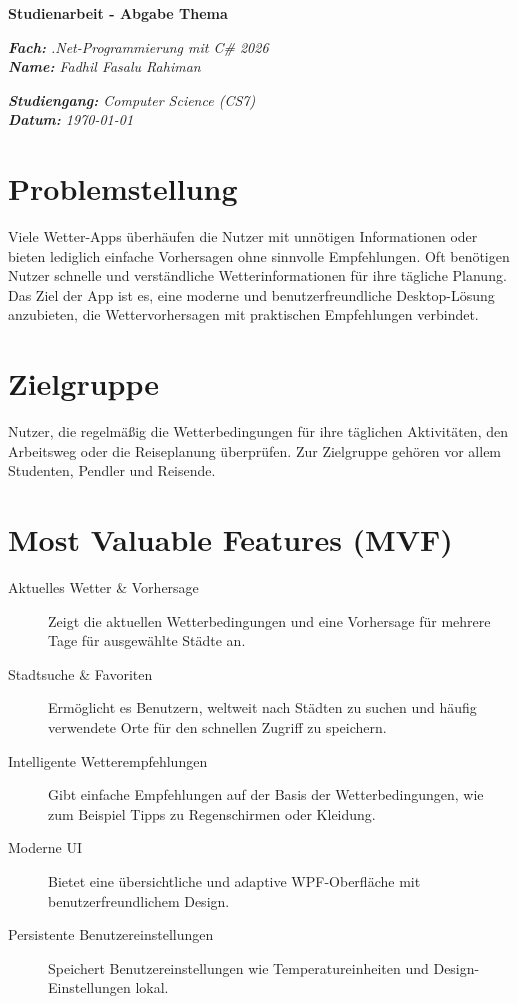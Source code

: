 \documentclass[12pt,a4paper]{article}
\begin{document}
\noindent
{\fontsize{24}{28}\selectfont\bfseries Studienarbeit - Abgabe Thema} \\
\begin{minipage}[t]{0.5\textwidth}
  \vspace{8pt}
  {\itshape \textbf{Fach:} .Net-Programmierung mit C\# 2026} \\
  {\itshape \textbf{Name:} Fadhil Fasalu Rahiman}
\end{minipage}
\begin{minipage}[t]{0.5\textwidth}
  \flushright
  \vspace{8pt}
  \itshape \textbf{Studiengang:} Computer Science (CS7)\\
  \itshape \textbf{Datum:} \today
\end{minipage}

\section{Problemstellung}
Viele Wetter-Apps überhäufen die Nutzer mit unnötigen Informationen oder bieten lediglich einfache Vorhersagen ohne sinnvolle Empfehlungen. Oft benötigen Nutzer schnelle und verständliche Wetterinformationen für ihre tägliche Planung. Das Ziel der App ist es, eine moderne und benutzerfreundliche Desktop-Lösung anzubieten, die Wettervorhersagen mit praktischen Empfehlungen verbindet.

\section{Zielgruppe}
Nutzer, die regelmäßig die Wetterbedingungen für ihre täglichen Aktivitäten, den Arbeitsweg oder die Reiseplanung überprüfen. Zur Zielgruppe gehören vor allem Studenten, Pendler und Reisende.

\section{Most Valuable Features (MVF)}
\begin{description}
  \item [Aktuelles Wetter \& Vorhersage] Zeigt die aktuellen Wetterbedingungen und eine Vorhersage für mehrere Tage für ausgewählte Städte an.
  \item [Stadtsuche \& Favoriten] Ermöglicht es Benutzern, weltweit nach Städten zu suchen und häufig verwendete Orte für den schnellen Zugriff zu speichern.
  \item [Intelligente Wetterempfehlungen] Gibt einfache Empfehlungen auf der Basis der Wetterbedingungen, wie zum Beispiel Tipps zu Regenschirmen oder Kleidung.
  \item [Moderne UI] Bietet eine übersichtliche und adaptive WPF-Oberfläche mit benutzerfreundlichem Design.
  \item [Persistente Benutzereinstellungen] Speichert Benutzereinstellungen wie Temperatureinheiten und Design-Einstellungen lokal.
\end{description}
\end{document}
